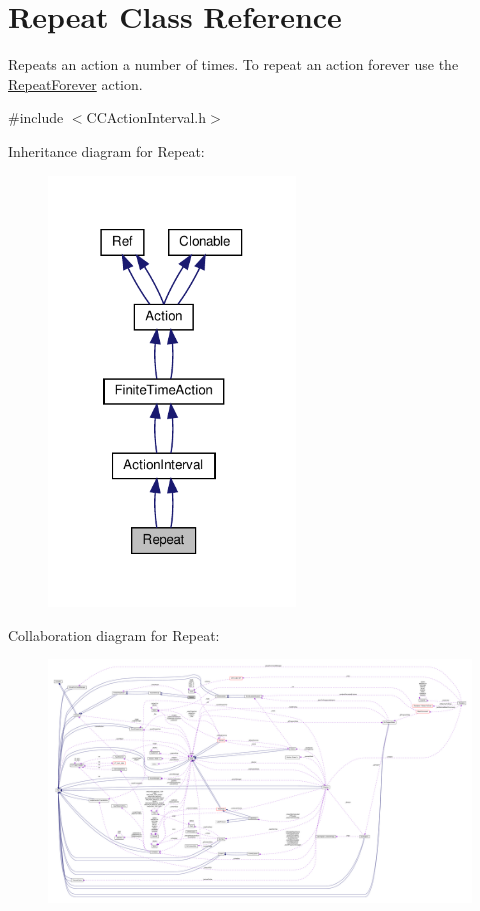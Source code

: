 \hypertarget{classRepeat}{}\section{Repeat Class Reference}
\label{classRepeat}


Repeats an action a number of times. To repeat an action forever use the \hyperlink{classRepeatForever}{Repeat\+Forever} action.  




{\ttfamily \#include $<$C\+C\+Action\+Interval.\+h$>$}



Inheritance diagram for Repeat\+:
\nopagebreak
\begin{figure}[H]
\begin{center}
\leavevmode
\includegraphics[width=186pt]{classRepeat__inherit__graph}
\end{center}
\end{figure}


Collaboration diagram for Repeat\+:
\nopagebreak
\begin{figure}[H]
\begin{center}
\leavevmode
\includegraphics[width=350pt]{classRepeat__coll__graph}
\end{center}
\end{figure}
